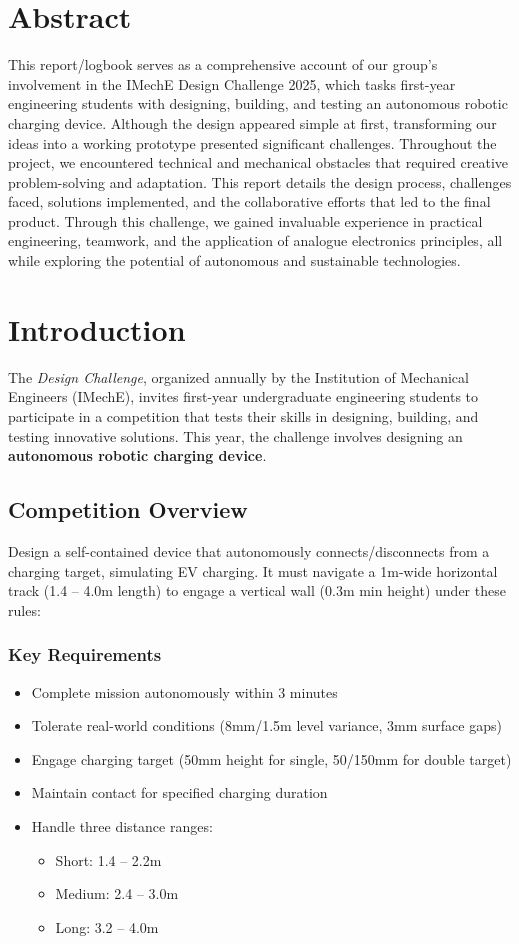 \documentclass{article}
\begin{document}
\section{Abstract}
This report/logbook serves as a comprehensive account of our group's involvement in the IMechE Design Challenge 2025, which tasks first-year engineering students with designing, building, and testing an autonomous robotic charging device. Although the design appeared simple at first, transforming our ideas into a working prototype presented significant challenges. Throughout the project, we encountered technical and mechanical obstacles that required creative problem-solving and adaptation. This report details the design process, challenges faced, solutions implemented, and the collaborative efforts that led to the final product. Through this challenge, we gained invaluable experience in practical engineering, teamwork, and the application of analogue electronics principles, all while exploring the potential of autonomous and sustainable technologies.

\newpage
\section{Introduction}
The \textit{Design Challenge}, organized annually by the Institution of Mechanical Engineers (IMechE), invites first-year undergraduate engineering students to participate in a competition that tests their skills in designing, building, and testing innovative solutions. This year, the challenge involves designing an \textbf{autonomous robotic charging device}. 
\subsection{Competition Overview}
Design a self-contained device that autonomously connects/disconnects from a charging target, simulating EV charging. It must navigate a 1m-wide horizontal track (1.4 -- 4.0m length) to engage a vertical wall (0.3m min height) under these rules:
\subsubsection*{Key Requirements}
\begin{itemize}[itemsep=-0.5mm,topsep=0pt]
	\item Complete mission autonomously within 3 minutes
	\item Tolerate real-world conditions (8mm/1.5m level variance, 3mm surface gaps)
	\item Engage charging target (50mm height for single, 50/150mm for double target)
	\item Maintain contact for specified charging duration
	\item Handle three distance ranges:
	\begin{itemize}[noitemsep,topsep=0pt]
		\item Short: 1.4 -- 2.2m
		\item Medium: 2.4 -- 3.0m
		\item Long: 3.2 -- 4.0m
	\end{itemize}
\end{itemize}
\end{document}
